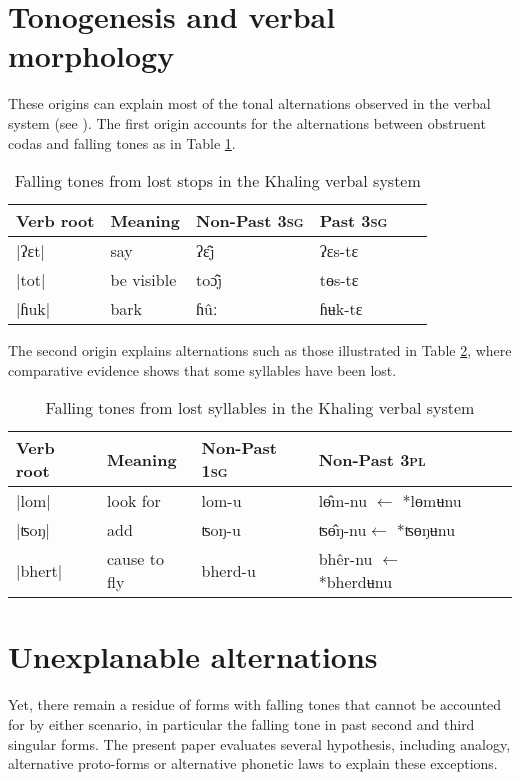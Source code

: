 \documentclass[oldfontcommands,oneside,a4paper,11pt]{article}
\newcommand{\ipa}[1]{{\phon \mbox{#1}}} %
\begin{document}
\section{Tonogenesis and verbal morphology}
These origins can explain most of the tonal alternations observed in the verbal system (see \citealt{jacques12khaling}). The first origin accounts for the alternations between obstruent codas and falling tones as in Table \ref{tab:falling.verb}.

\begin{table}[H]
\caption{Falling tones from lost stops in the Khaling verbal system} \centering \label{tab:falling.verb}
\begin{tabular}{llllll}
\toprule
Verb root	&Meaning	&Non-Past \textsc{3sg} & Past \textsc{3sg}\\
\midrule
|ʔɛt|	&	say			&\ipa{ʔɛ̂j} &\ipa{ʔɛs-tɛ} \\
|tot|	&	be visible			&\ipa{toɔ̂j} &\ipa{tɵs-tɛ} \\
|ɦuk|	&	bark			&\ipa{ɦûː} &\ipa{ɦʉk-tɛ} \\
\bottomrule
\end{tabular}
\end{table}
 
 The second origin explains   alternations such as those illustrated in Table  \ref{tab:falling.verb2}, where comparative evidence shows that some syllables have been lost.
\begin{table}[H]
\caption{Falling tones from lost syllables in the Khaling verbal system} \centering \label{tab:falling.verb2}
\begin{tabular}{llllll}
\toprule
Verb root	&Meaning	&Non-Past \textsc{1sg} & Non-Past \textsc{3pl} \\
\midrule
|lom|	&	look for		&\ipa{lom-u} &\ipa{lɵ̂m-nu} $\leftarrow$ *lɵmʉnu\\
|ʦoŋ|	&	add		&\ipa{ʦoŋ-u} &\ipa{ʦɵ̂ŋ-nu}$\leftarrow$ *ʦɵŋʉnu \\
|bhert|	&	cause to fly			&\ipa{bherd-u} &\ipa{bhêr-nu} $\leftarrow$ *bherdʉnu \\
\bottomrule
\end{tabular}
\end{table}


\section{Unexplanable alternations}
Yet, there remain a residue of forms with falling tones that cannot be accounted for by either scenario, in particular the falling tone in past second and third singular forms. The present paper evaluates several hypothesis, including analogy, alternative proto-forms or alternative phonetic laws to explain these exceptions.




\end{document}
